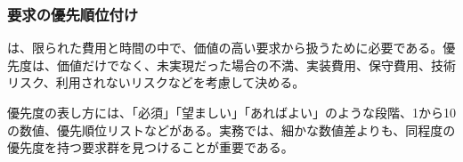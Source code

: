 \subsubsection{要求の優先順位付け}

は、限られた費用と時間の中で、価値の高い要求から扱うために必要である。優先度は、価値だけでなく、未実現だった場合の不満、実装費用、保守費用、技術リスク、利用されないリスクなどを考慮して決める。


優先度の表し方には、「必須」「望ましい」「あればよい」のような段階、1から10の数値、優先順位リストなどがある。実務では、細かな数値差よりも、同程度の優先度を持つ要求群を見つけることが重要である。
